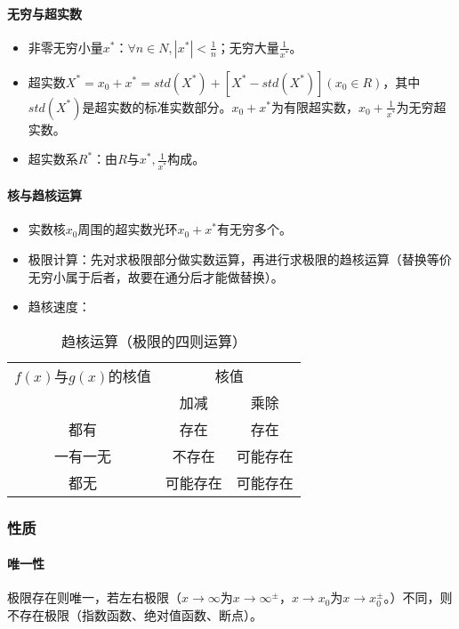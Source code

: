 \documentclass[
12pt, %
a4paper, 
oneside, %
headinclude,footinclude, %
]{scrartcl}
\begin{document}
\paragraph{无穷与超实数}
\begin{itemize}
\item 非零无穷小量$ x^* $：$ \forall n \in N, |x^*| < \frac{1}{n} $；无穷大量$ \frac{1}{x^*} $。
\item 超实数$ X^* = x_0 + x^* = std(X^*) + [X^* - std(X^*)](x_0 \in R) $，其中$ std(X^*) $是超实数的标准实数部分。$ x_0 + x^* $为有限超实数，$ x_0 + \frac{1}{x^*} $为无穷超实数。
\item 超实数系$ R^* $：由$ R $与$ x^*, \frac{1}{x^*} $构成。
\end{itemize}
\paragraph{核与趋核运算}
\begin{itemize}
\item 实数核$ x_0 $周围的超实数光环$ x_0 + x^* $有无穷多个。
\item 极限计算：先对求极限部分做实数运算，再进行求极限的趋核运算（替换等价无穷小属于后者，故要在通分后才能做替换）。
\item 趋核速度：
\end{itemize}

\begin{table}[H]
\centering
\begin{tabular}{c|cc}
\toprule
$ f(x) $与$ g(x) $的核值 & \multicolumn{2}{c}{核值} \\
\cmidrule(lr){2-3}
& 加减 & 乘除 \\
\midrule
都有 & 存在 & 存在 \\
一有一无 & 不存在 & 可能存在 \\
都无 & 可能存在 & 可能存在 \\
\bottomrule
\end{tabular}
\caption{趋核运算（极限的四则运算）}
\end{table}
\subsubsection[性质]{性质}
\paragraph{唯一性}
极限存在则唯一，若左右极限（$ x \to \infty $为$ x \to \infty^\pm $，$ x \to x_0 $为$ x \to x_0^\pm $。）不同，则不存在极限（指数函数、绝对值函数、断点）。
\end{document}
